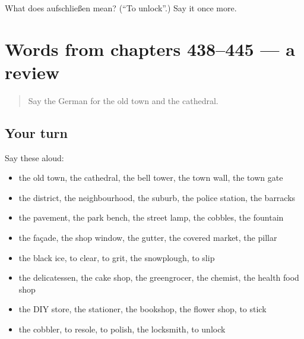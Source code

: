 \begin{tcolorbox}[breakable,colback=teal!4,colframe=teal!35!black,title={Before you move on}]
What does aufschließen mean? (\textquotedblleft{}To unlock\textquotedblright{}.) Say it once more.
\end{tcolorbox}
\section[(dialogue)]{Words from chapters 438–445 — a review}

\label{lesson:GE-R445-review-438-445}



\begin{quote}
Say the German for the old town and the cathedral.
\end{quote}

\subsection*{Your turn}
Say these aloud:

\begin{itemize}
\raggedright
  \item the old town, the cathedral, the bell tower, the town wall, the town gate
  \item the district, the neighbourhood, the suburb, the police station, the barracks
  \item the pavement, the park bench, the street lamp, the cobbles, the fountain
  \item the façade, the shop window, the gutter, the covered market, the pillar
  \item the black ice, to clear, to grit, the snowplough, to slip
  \item the delicatessen, the cake shop, the greengrocer, the chemist, the health food shop
  \item the DIY store, the stationer, the bookshop, the flower shop, to stick
  \item the cobbler, to resole, to polish, the locksmith, to unlock
\end{itemize}

